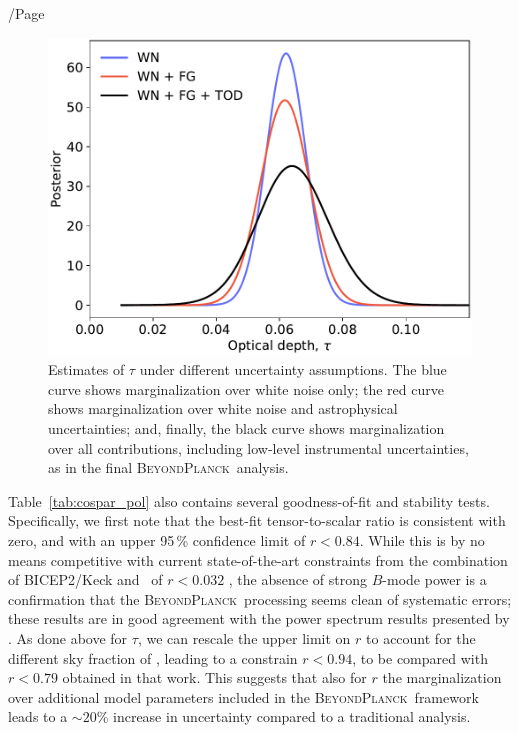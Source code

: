 /Page\documentclass[twocolumn]{aa}
\newcommand{\BP}{\textsc{BeyondPlanck}}
\begin{document}
\begin{figure}[t]
	\center
	\includegraphics[width=\linewidth]{figs/BP10_tau_syst_assess.pdf}
        \caption{Estimates of $\tau$ under different uncertainty
          assumptions. The blue curve shows marginalization over white
          noise only; the red 
          curve shows marginalization over white noise and
          astrophysical uncertainties; and, finally, the black curve
          shows marginalization over all contributions, including
          low-level instrumental uncertainties, as in the
          final \BP\ analysis.}
	\label{fig:tau_assess}
\end{figure}


Table~\ref{tab:cospar_pol} also contains several goodness-of-fit and
stability tests. Specifically, we first note that the best-fit
tensor-to-scalar ratio is consistent with zero, and with an upper
95\,\% confidence limit of $r<0.84$. While this is by no means
competitive with current state-of-the-art constraints from the
combination of BICEP2/Keck and \Planck\ of $r<0.032$
\citep{tristram:2021}, the absence of strong $B$-mode power is a
confirmation that the \BP\ processing seems clean of systematic
errors; these results are in good agreement with the power spectrum
results presented by \citet{bp11}. As done above for $\tau$, 
we can rescale the upper limit on $r$ to account for the different sky 
fraction of \cite{natale:2020}, leading to a constrain $r<0.94$, 
to be compared with $r<0.79$ obtained in that work. This suggests that 
also for $r$ the marginalization over additional model parameters 
included in the \BP\ framework leads to a $\sim 20\%$ increase in 
uncertainty compared to a traditional analysis. 
\end{document}

